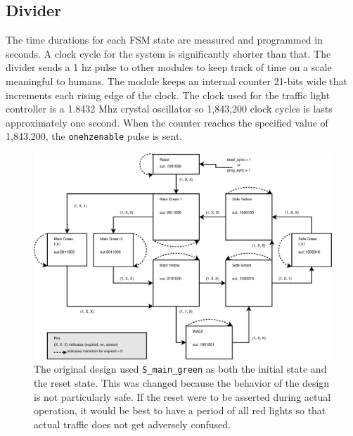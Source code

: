 \documentclass[12pt]{article}
\begin{document}
	\subsection{Divider}
	The time durations for each FSM state are measured and programmed in
	seconds.  A clock cycle for the system is significantly shorter than that.
	The divider sends a 1 hz pulse to other modules to keep track of time on a
	scale meaningful to humans.  The module keeps an internal counter 21-bits
	wide that increments each rising edge of the clock.  The clock used for the
	traffic light controller is a 1.8432 Mhz crystal oscillator so 1,843,200
	clock cycles is lasts approximately one second.  When the counter reaches
	the specified value of 1,843,200, the \texttt{onehzenable} pulse is sent.

	\begin{figure}
	\centering
	\includegraphics[scale=0.33]{fsm.ps}
	\caption[Finite State Machine for the Traffic Light Controller]
	{The original design used \texttt{S\_main\_green} as both
	the initial state and the reset state.  This was changed because the
	behavior of the design is not particularly safe.  If the reset were to
	be asserted during actual operation, it would be best to have a period
	of all red lights so that actual traffic does not get adversely
	confused.}
	\label{fig:fsm}
	\end{figure}
\end{document}
